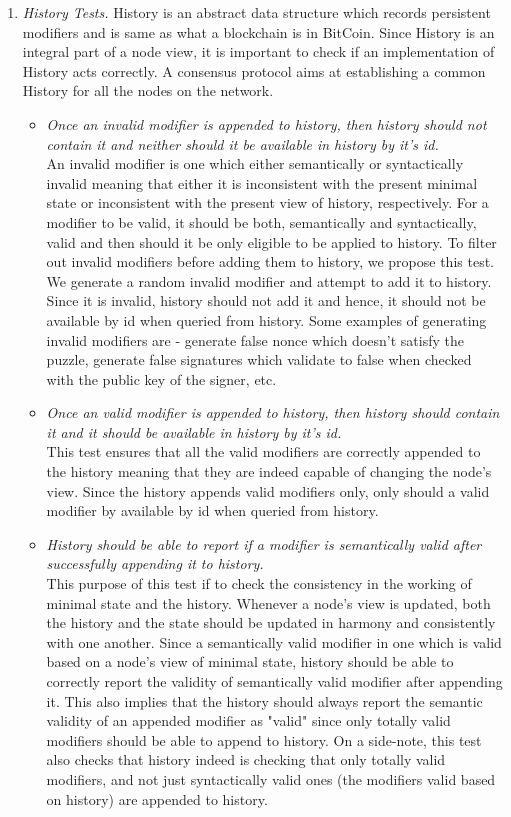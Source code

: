 \begin{enumerate}[\IEEEsetlabelwidth{Z}]
\begin{itemize}[]
\end{itemize}
\item \textit{History Tests.}
History is an abstract data structure which records persistent modifiers and is same as what a blockchain is in BitCoin. Since History is an integral part of a node view, it is important to check if an implementation of History acts correctly. A consensus protocol aims at establishing a common History for all the nodes on the network.
\begin{itemize}[]
\item \textit{Once an invalid modifier is appended to history, then history should not contain it and neither should it be available in history by it's id.}\\
An invalid modifier is one which either semantically or syntactically invalid meaning that either it is inconsistent with the present minimal state or inconsistent with the present view of history, respectively. For a modifier to be valid, it should be both, semantically and syntactically, valid and then should it be only eligible to be applied to history. To filter out invalid modifiers before adding them to history, we propose this test. We generate a random invalid modifier and attempt to add it to history. Since it is invalid, history should not add it and hence, it should not be available by id when queried from history. Some examples of generating invalid modifiers are - generate false nonce which doesn't satisfy the puzzle, generate false signatures which validate to false when checked with the public key of the signer, etc.
\item \textit{Once an valid modifier is appended to history, then history should contain it and it should be available in history by it's id.}\\
This test ensures that all the valid modifiers are correctly appended to the history meaning that they are indeed capable of changing the node's view. Since the history appends valid modifiers only, only should a valid modifier by available by id when queried from history.
\item \textit{History should be able to report if a modifier is semantically valid after successfully appending it to history.}\\
This purpose of this test if to check the consistency in the working of minimal state and the history. Whenever a node's view is updated, both the history and the state should be updated in harmony and consistently with one another. Since a semantically valid modifier in one which is valid based on a node's view of minimal state, history should be able to correctly report the validity of semantically valid modifier after appending it. This also implies that the history should always report the semantic validity of an appended modifier as "valid" since only totally valid modifiers should be able to append to history. On a side-note, this test also checks that history indeed is checking that only totally valid modifiers, and not just syntactically valid ones (the modifiers valid based on history) are appended to history.

\end{itemize}
\end{enumerate}
